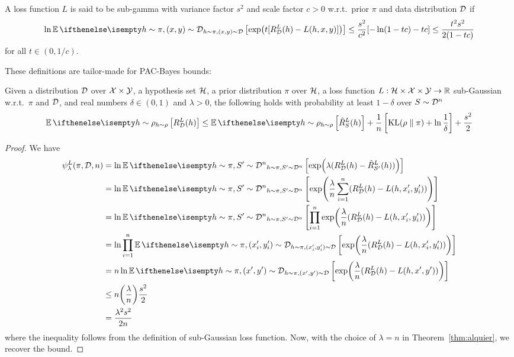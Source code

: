 \begin{definition}
  A loss function $L$ is said to be sub-gamma with variance factor $s^2$ and
  scale factor $c > 0$ w.r.t.\ prior $\pi$ and data distribution $\mathcal{D}$ if
  \begin{equation}
    \ln \Ev[h \sim \pi, (x, y) \sim \CD]{\exp(t [R_\CD^L(h) - L(h, x, y)])} \leq
    \frac{s^2}{c^2} [-\ln(1 - t c) - t c] \leq \frac{t^2 s^2}{2 (1 - t c)}
  \end{equation}
  for all $t \in (0, 1 / c)$.
\end{definition}

These definitions are tailor-made for PAC-Bayes bounds:

\begin{corollary}
  Given a distribution $\mathcal{D}$ over $\mathcal{X} \times \mathcal{Y}$, a hypothesis set $\mathcal{H}$, a
  prior distribution $\pi$ over $\mathcal{H}$, a loss function $L : \mathcal{H} \times \mathcal{X} \times
  \mathcal{Y} \to \mathbb{R}$ sub-Gaussian w.r.t.\ $\pi$ and $\mathcal{D}$, and real numbers $\delta \in
  (0, 1)$ and $\lambda > 0$, the following holds with probability at least $1 -
  \delta$ over $S \sim \mathcal{D}^n$
  \begin{equation}
    \label{eq:alquier-bound-sub-gaussian-loss}
    \Ev[h \sim \rho]{R_\CD^L(h)} \leq \Ev[h \sim \rho]{\hat{R}_S^L(h)} +
    \frac{1}{n}\left[\KL{\rho}{\pi} + \ln \frac{1}{\delta}\right] +
    \frac{s^2}{2}
  \end{equation}
\end{corollary}

\begin{proof}
  We have
  \begin{equation}
    \begin{split}
      \psi_\lambda^L(\pi, \CD, n)
      &=\ln \Ev[h \sim \pi, S' \sim \CD^n]{\exp(\lambda (R_\CD^L(h) -
      \hat{R}_{S'}^L(h)))} \\
      &= \ln \Ev[h \sim \pi, S' \sim \CD^n]{\exp(\frac{\lambda}{n} \sum_{i =
      1}^n (R_\CD^L(h) - L(h, x_i', y_i')))} \\
      &= \ln \Ev[h \sim \pi, S' \sim \CD^n]{\prod_{i = 1}^n
      \exp(\frac{\lambda}{n} (R_\CD^L(h) - L(h, x_i', y_i')))} \\
      &= \ln \prod_{i = 1}^n \Ev[h \sim \pi, (x_i', y_i') \sim
      \CD]{\exp(\frac{\lambda}{n} (R_\CD^L(h) - L(h, x_i', y_i')))} \\
      &= n \ln \Ev[h \sim \pi, (x', y') \sim \CD]{\exp(\frac{\lambda}{n}
      (R_\CD^L(h) - L(h, x', y')))} \\
      &\leq n \qty(\frac{\lambda}{n}) \frac{s^2}{2} \\
      &= \frac{\lambda^2 s^2}{2 n}
    \end{split}
  \end{equation}
  where the inequality follows from the definition of sub-Gaussian loss
  function. Now, with the choice of $\lambda = n$ in Theorem~\ref{thm:alquier},
  we recover the bound.
\end{proof}

